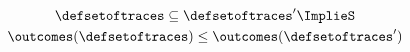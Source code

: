 \begin{gather*}
  \defsetoftraces \subseteq \defsetoftraces' \ImplieS \\
  \outcomes(\defsetoftraces) \le \outcomes(\defsetoftraces')
\end{gather*}
